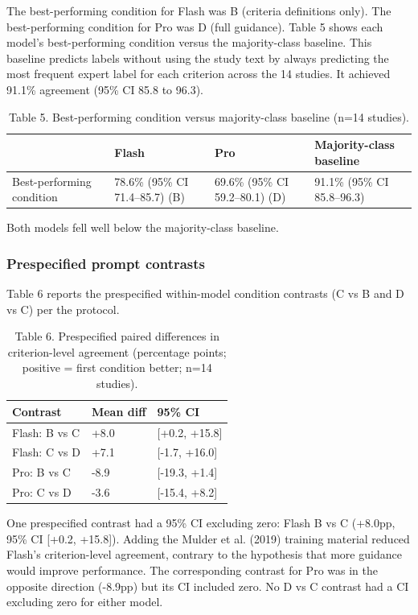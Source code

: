 \documentclass[11pt,a4paper]{article}
\begin{document}
The best-performing condition for Flash was B (criteria definitions only). The best-performing condition for Pro was D (full guidance). Table 5 shows each model's best-performing condition versus the majority-class baseline. This baseline predicts labels without using the study text by always predicting the most frequent expert label for each criterion across the 14 studies. It achieved 91.1\% agreement (95\% CI 85.8 to 96.3).

\begin{table}[H]
\centering
\caption{Table 5. Best-performing condition versus majority-class baseline (n=14 studies).}
\label{tab:table5}
\begin{tabular}{llll}
\toprule
 & Flash & Pro & Majority-class baseline \\
\midrule
Best-performing condition & 78.6\% (95\% CI 71.4–85.7) (B) & 69.6\% (95\% CI 59.2–80.1) (D) & 91.1\% (95\% CI 85.8–96.3) \\
\bottomrule
\end{tabular}
\end{table}

Both models fell well below the majority-class baseline.

\subsubsection{Prespecified prompt contrasts}

Table 6 reports the prespecified within-model condition contrasts (C vs B and D vs C) per the protocol.

\begin{table}[H]
\centering
\caption{Table 6. Prespecified paired differences in criterion-level agreement (percentage points; positive = first condition better; n=14 studies).}
\label{tab:table6}
\begin{tabular}{lll}
\toprule
Contrast & Mean diff & 95\% CI \\
\midrule
Flash: B vs C & +8.0 & [+0.2, +15.8] \\
Flash: C vs D & +7.1 & [-1.7, +16.0] \\
Pro: B vs C & -8.9 & [-19.3, +1.4] \\
Pro: C vs D & -3.6 & [-15.4, +8.2] \\
\bottomrule
\end{tabular}
\end{table}

One prespecified contrast had a 95\% CI excluding zero: Flash B vs C (+8.0pp, 95\% CI [+0.2, +15.8]). Adding the Mulder et al. (2019) training material reduced Flash's criterion-level agreement, contrary to the hypothesis that more guidance would improve performance. The corresponding contrast for Pro was in the opposite direction (-8.9pp) but its CI included zero. No D vs C contrast had a CI excluding zero for either model.
\end{document}
